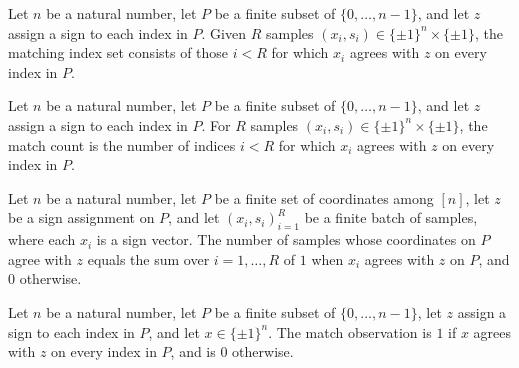 \begin{definition}
\label{FABL.juntaMatchingIndices}
\leanok
{}
Let $n$ be a natural number, let $P$ be a finite subset of $\{0,\ldots,n-1\}$, and let
$z$ assign a sign to each index in $P$. Given $R$ samples
$(x_i,s_i)\in\{\pm1\}^n\times\{\pm1\}$, the matching index set consists of those $i<R$
for which $x_i$ agrees with $z$ on every index in $P$.
\end{definition}

\begin{definition}
\label{FABL.juntaMatchCount}
\leanok
{}
Let $n$ be a natural number, let $P$ be a finite subset of $\{0,\ldots,n-1\}$, and let
$z$ assign a sign to each index in $P$. For $R$ samples
$(x_i,s_i)\in\{\pm1\}^n\times\{\pm1\}$, the match count is the number of indices $i<R$
for which $x_i$ agrees with $z$ on every index in $P$.
\end{definition}

\begin{theorem}
\label{FABL.juntaMatchCount_eq_sum}
\leanok
{}
Let $n$ be a natural number, let $P$ be a finite set of coordinates among $[n]$, let $z$
be a sign assignment on $P$, and let $(x_i,s_i)_{i=1}^R$ be a finite batch of samples,
where each $x_i$ is a sign vector. The number of samples whose coordinates on $P$ agree
with $z$ equals the sum over $i=1,\ldots,R$ of $1$ when $x_i$ agrees with $z$ on $P$, and $0$
otherwise.
\end{theorem}

\begin{definition}
\label{FABL.juntaMatchObservation}
\leanok
{}
Let $n$ be a natural number, let $P$ be a finite subset of $\{0,\ldots,n-1\}$, let $z$
assign a sign to each index in $P$, and let $x\in\{\pm1\}^n$. The match observation is
$1$ if $x$ agrees with $z$ on every index in $P$, and is $0$ otherwise.
\end{definition}

